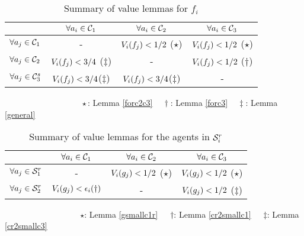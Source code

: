 \begin{table}[t]
	\caption{Summary of value lemmas for $f_i$}
	\label{table0} 
	\begin{center}
\begin{tabular}{|c|c|c|c|}
\hline
	& $\forall a_i \in \mathcal{C}_1$&  $\forall a_i \in \mathcal{C}_2$ & $\forall a_i \in \mathcal{C}_3$\\
\hline
$\forall a_j \in \mathcal{C}_1$&	- & $V_i(f_j) < 1/2$ ($\star$)& $V_i(f_j) < 1/2$ ($\star$) \\
\hline
$\forall a_j \in \mathcal{C}_2$ & $ V_i(f_j) < 3/4 $ ($\ddagger$)  & - & $V_i(f_j) < 1/2$ ($\dagger$)\\ 
\hline
$\forall a_j \in \mathcal{C}_3^s$ & $ V_i(f_j) < 3/4 $($\ddagger$)  & $V_i(f_j) <3/4$($\ddagger$)  &  - \\ 
\hline

\end{tabular}
\end{center}
$\hspace{110pt} \star$: Lemma \ref{forc2c3} $\hspace{10pt} \dagger$: Lemma \ref{forc3} $\hspace{10pt} \ddagger$: Lemma \ref{general}\\
\end{table}


\begin{table}[t]
	\caption{Summary of value lemmas for the agents in $\mathcal{S}_i^r$}
	\label{table4} 
\begin{center}
	\begin{tabular}{|c|c|c|c|}
\hline
	&  $\forall a_i \in \mathcal{C}_1 $ & $\forall a_i \in \mathcal{C}_2$ & $\forall a_i \in \mathcal{C}_3$\\
\hline
$\forall a_j \in \mathcal{S}_1^r $	 & - & $V_i(g_j)<1/2$ ($\star$)& $V_i(g_j)<1/2$ ($\star$)\\
\hline
$\forall a_j \in \mathcal{S}_2^r $	 & $V_i(g_j)<\epsilon_i (\dagger)$ & - & $V_i(g_j)<1/2$ ($\ddagger$) \\
\hline
\end{tabular}
\end{center}
$\hspace{105pt}$ $\star$: Lemma \ref{gsmallc1r} $\hspace{10pt}$ $\dagger$: Lemma \ref{cr2smallc1} $\hspace{10pt}$ $\ddagger$: Lemma \ref{cr2smallc3}\\

\end{table}
